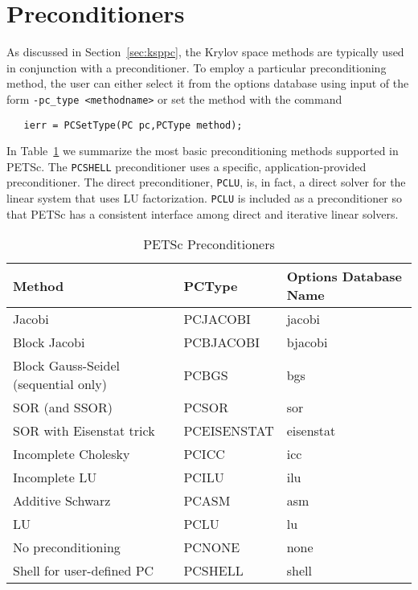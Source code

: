 \section{Preconditioners} 
\label{sec:pc}

As discussed in Section~\ref{sec:ksppc}, the Krylov space methods are
typically used in conjunction with a preconditioner.
To employ a particular preconditioning method, the user can either select 
it from the options database using input of the form 
{\tt -pc\_type <methodname>} or set the method with the 
command  
\begin{verbatim}
   ierr = PCSetType(PC pc,PCType method);
\end{verbatim}
In Table~\ref{tab:pcdefaults} we summarize the most basic
preconditioning methods supported in PETSc. 
   
   
The {\tt PCSHELL} preconditioner uses a specific,
application-provided preconditioner.  The direct preconditioner, {\tt PCLU},
is, in fact, a direct solver for the linear system that uses LU
factorization. {\tt PCLU} is included as a preconditioner so that PETSc has a
consistent interface among direct and iterative linear solvers.

\begin{table}
\begin{center}
\begin{tabular}{lll}
{\bf Method}	&{\bf PCType}	& {\bf Options Database Name}\\
\hline
Jacobi                               & PCJACOBI      & jacobi\\
Block Jacobi                         & PCBJACOBI     & bjacobi\\
Block Gauss-Seidel (sequential only) & PCBGS         & bgs\\
SOR (and SSOR)                       & PCSOR         & sor\\
SOR with Eisenstat trick             & PCEISENSTAT   & eisenstat\\
Incomplete Cholesky                  & PCICC         & icc\\
Incomplete LU                        & PCILU         & ilu\\
Additive Schwarz                     & PCASM         & asm\\
\hline
LU                                   & PCLU          & lu\\
No preconditioning                   & PCNONE        & none\\
Shell for user-defined PC            & PCSHELL       & shell\\
\hline
\end{tabular}
\end{center}
\caption{PETSc Preconditioners}
\label{tab:pcdefaults}
\end{table}

